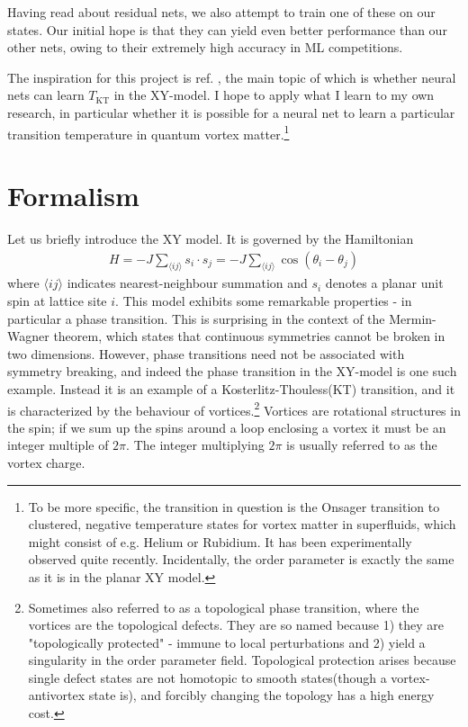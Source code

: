 \documentclass[]{article}
\begin{document}
Having read about residual nets, we also attempt to train one of these on our states. Our initial hope is that they can yield even better performance than our other nets, owing to their extremely high accuracy in ML competitions.

The inspiration for this project is ref. \cite{PhysRevB.97.045207}, the main topic of which is whether neural nets can learn $T_\text{KT}$ in the XY-model. I hope to apply what I learn to my own research, in particular whether it is possible for a neural net to learn a particular transition temperature in quantum vortex matter.\footnote{To be more specific, the transition in question is the Onsager transition\cite{onsager} to clustered, negative temperature states for vortex matter in superfluids, which might consist of e.g. Helium or Rubidium. It has been experimentally observed quite recently.\cite{Gauthier1264} Incidentally, the order parameter is exactly the same as it is in the planar XY model.}

\section{Formalism}
Let us briefly introduce the XY model. It is governed by the Hamiltonian
\begin{align}
H = -J\sum_{\langle ij\rangle}s_i\cdot s_j = -J\sum_{\langle ij\rangle}\cos(\theta_i-\theta_j)
\end{align}
where $\langle ij \rangle$ indicates nearest-neighbour summation and $s_i$ denotes a planar unit spin at lattice site $i$. This model exhibits some remarkable properties - in particular a phase transition. This is surprising in the context of the Mermin-Wagner theorem\cite{PhysRevLett.17.1133}, which states that continuous symmetries cannot be broken in two dimensions. However, phase transitions need not be associated with symmetry breaking, and indeed the phase transition in the XY-model is one such example. Instead it is an example of a Kosterlitz-Thouless(KT) transition, and it is characterized by the behaviour of vortices.\footnote{Sometimes also referred to as a topological phase transition, where the vortices are the topological defects. They are so named because 1) they are "topologically protected" - immune to local perturbations and 2) yield a singularity in the order parameter field. Topological protection arises because single defect states are not homotopic to smooth states(though a vortex-antivortex state is), and forcibly changing the topology has a high energy cost.} Vortices are rotational structures in the spin; if we sum up the spins around a loop enclosing a vortex it must be an integer multiple of $2\pi$. The integer multiplying $2\pi$ is usually referred to as the vortex charge.
\end{document}
